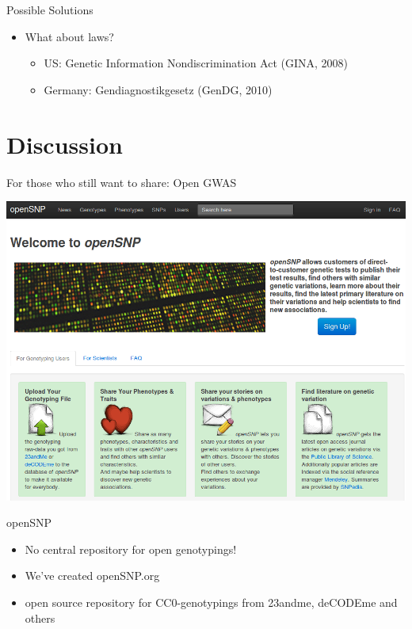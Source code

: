 \documentclass[12pt,a4paper]{beamer}
\begin{document}
\begin{frame}{Possible Solutions}
\begin{itemize}
\item What about laws?
\begin{itemize} 
\pause \item US: Genetic Information Nondiscrimination Act (GINA, 2008)
\pause \item Germany: Gendiagnostikgesetz (GenDG, 2010)
\end{itemize}
\end{itemize}
\end{frame}

\section{Discussion}

\begin{frame}{For those who still want to share: Open GWAS}
\begin{center}
\includegraphics[scale=0.4]{opensnp.png}
\end{center}
\end{frame}

\begin{frame}{openSNP}
\begin{itemize}
\item No central repository for open genotypings!
\pause \item We've created openSNP.org
\pause \item open source repository for CC0-genotypings from 23andme, deCODEme and others
\end{itemize}
\end{frame}
\end{document}

